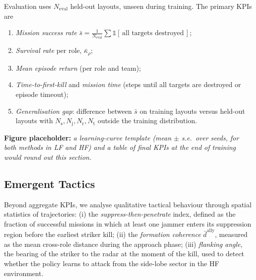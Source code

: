 Evaluation uses $N_{\mathrm{eval}}$ held-out layouts, unseen during training.
The primary KPIs are
\begin{enumerate}[leftmargin=1.25em]
\item \emph{Mission success rate} $\bar{s} = \tfrac{1}{N_{\mathrm{eval}}}
\sum \mathbb{1}[\,\text{all targets destroyed}\,]$;
\item \emph{Survival rate} per role, $\bar{\kappa}_\rho$;
\item \emph{Mean episode return} (per role and team);
\item \emph{Time-to-first-kill} and \emph{mission time} (steps until all
targets are destroyed or episode timeout);
\item \emph{Generalisation gap}: difference between $\bar{s}$ on
training layouts versus held-out layouts with $N_{\mathrm{s}},N_{\mathrm{j}},
N_{\mathrm{r}},N_{\mathrm{t}}$ outside the training distribution.
\end{enumerate}

\textbf{Figure placeholder:} \emph{a learning-curve template (mean
$\pm$ s.e.\ over seeds, for both methods in LF and HF) and a table of
final KPIs at the end of training would round out this section.}

\subsection{Emergent Tactics}
\label{sec:tactics}

Beyond aggregate KPIs, we analyse qualitative tactical behaviour through
spatial statistics of trajectories: (i) the \emph{suppress-then-penetrate}
index, defined as the fraction of successful missions in which at least one
jammer enters its suppression region before the earliest striker kill;
(ii) the \emph{formation coherence} $\bar d^{\mathrm{ally}}$, measured as the
mean cross-role distance during the approach phase; (iii) \emph{flanking
angle}, the bearing of the striker to the radar at the moment of the kill,
used to detect whether the policy learns to attack from the side-lobe sector
in the HF environment.
